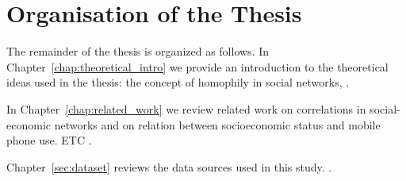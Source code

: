 
\section{Organisation of the Thesis}

The remainder of the thesis is organized as follows.
In Chapter~\ref{chap:theoretical_intro} we provide an introduction to the theoretical ideas used in the thesis: the concept of homophily in social networks, .

In Chapter~\ref{chap:related_work} we review related work on correlations in social-economic networks and on relation between socioeconomic status and mobile phone use. ETC .

Chapter~\ref{sec:dataset} reviews the data sources used in this study. .




